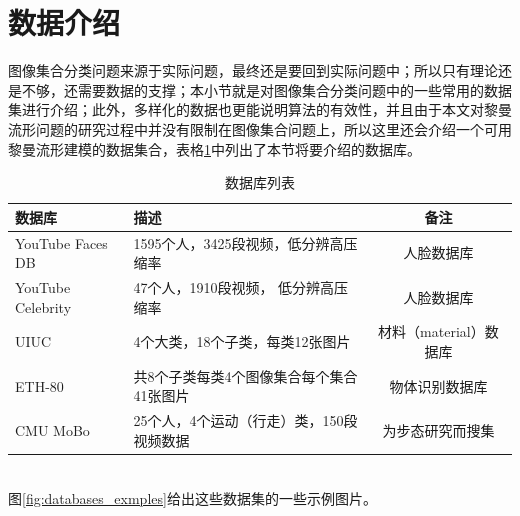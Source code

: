\section{数据介绍}
\label{sec:data_intro}
图像集合分类问题来源于实际问题，最终还是要回到实际问题中；所以只有理论还是不够，还需要数据的支撑；本小节就是对图像集合分类问题中的一些常用的数据集进行介绍；此外，多样化的数据也更能说明算法的有效性，并且由于本文对黎曼流形问题的研究过程中并没有限制在图像集合问题上，所以这里还会介绍一个可用黎曼流形建模的数据集合，表格\ref{tab:database_list}中列出了本节将要介绍的数据库。
\begin{table}[htb]
	\centering
	\caption{数据库列表}
	\begin{tabular}{l|l|c}
	\toprule[1.5pt]
		{\heiti 数据库} &{\heiti 描述} &{\heiti 备注} \\ \hline
		YouTube Faces DB\cite{Database_YTF} &1595个人，3425段视频，低分辨高压缩率 &人脸数据库 \\ \hline
		YouTube Celebrity\cite{Database_YTC} &47个人，1910段视频， 低分辨高压缩率 &人脸数据库 \\ \hline
		UIUC\cite{Database_UIUC} &4个大类，18个子类，每类12张图片 &材料（material）数据库 \\ \hline
		ETH-80\cite{Database_ETH80}   &共8个子类每类4个图像集合每个集合41张图片 &物体识别数据库 \\ \hline
		CMU MoBo\cite{Database_MoBo} &25个人，4个运动（行走）类，150段视频数据 &为步态研究而搜集 \\
	\bottomrule[1.5pt]
	\end{tabular}
	\label{tab:database_list}
\end{table}\\
图\ref{fig:databases_exmples}给出这些数据集的一些示例图片。
